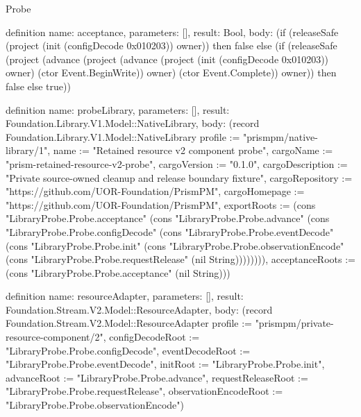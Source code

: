 \begin{lexlean}{Probe}
\begin{semanticmodule}
definition{
  name: acceptance,
  parameters: [],
  result: Bool,
  body: (if (releaseSafe (project (init (configDecode 0x010203)) owner)) then false else (if (releaseSafe (project (advance (project (advance (project (init (configDecode 0x010203)) owner) (ctor Event.BeginWrite)) owner) (ctor Event.Complete)) owner)) then false else true))
}

definition{
  name: probeLibrary,
  parameters: [],
  result: Foundation.Library.V1.Model::NativeLibrary,
  body: (record Foundation.Library.V1.Model::NativeLibrary {profile := "prismpm/native-library/1", name := "Retained resource v2 component probe", cargoName := "prism-retained-resource-v2-probe", cargoVersion := "0.1.0", cargoDescription := "Private source-owned cleanup and release boundary fixture", cargoRepository := "https://github.com/UOR-Foundation/PrismPM", cargoHomepage := "https://github.com/UOR-Foundation/PrismPM", exportRoots := (cons "LibraryProbe.Probe.acceptance" (cons "LibraryProbe.Probe.advance" (cons "LibraryProbe.Probe.configDecode" (cons "LibraryProbe.Probe.eventDecode" (cons "LibraryProbe.Probe.init" (cons "LibraryProbe.Probe.observationEncode" (cons "LibraryProbe.Probe.requestRelease" (nil String)))))))), acceptanceRoots := (cons "LibraryProbe.Probe.acceptance" (nil String))})
}

definition{
  name: resourceAdapter,
  parameters: [],
  result: Foundation.Stream.V2.Model::ResourceAdapter,
  body: (record Foundation.Stream.V2.Model::ResourceAdapter {profile := "prismpm/private-resource-component/2", configDecodeRoot := "LibraryProbe.Probe.configDecode", eventDecodeRoot := "LibraryProbe.Probe.eventDecode", initRoot := "LibraryProbe.Probe.init", advanceRoot := "LibraryProbe.Probe.advance", requestReleaseRoot := "LibraryProbe.Probe.requestRelease", observationEncodeRoot := "LibraryProbe.Probe.observationEncode"})
}
\end{semanticmodule}
\end{lexlean}
